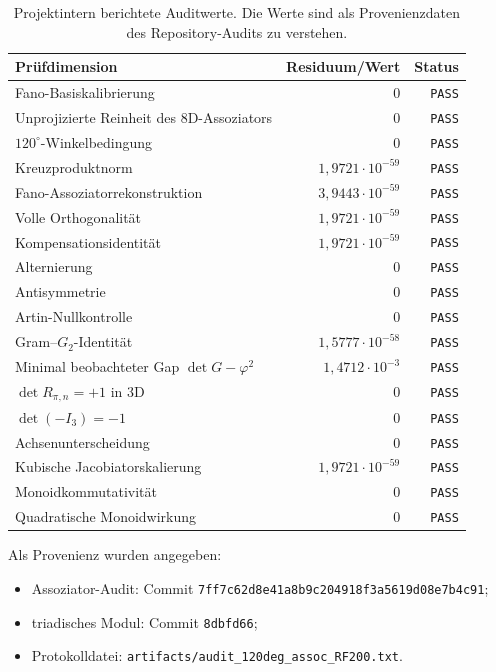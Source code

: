 \documentclass[11pt,a4paper]{article}
\theoremstyle{definition}
\begin{document}
\begin{table}[ht]
\centering
\small
\caption{Projektintern berichtete Auditwerte. Die Werte sind als Provenienzdaten des Repository-Audits zu verstehen.}
\label{tab:audit}
\begin{tabularx}{\textwidth}{@{}Xrr@{}}
\toprule
\textbf{Prüfdimension} & \textbf{Residuum/Wert} & \textbf{Status}\\
\midrule
Fano-Basiskalibrierung & $0$ & \texttt{PASS}\\
Unprojizierte Reinheit des 8D-Assoziators & $0$ & \texttt{PASS}\\
$120^\circ$-Winkelbedingung & $0$ & \texttt{PASS}\\
Kreuzproduktnorm & $1{,}9721\cdot10^{-59}$ & \texttt{PASS}\\
Fano-Assoziatorrekonstruktion & $3{,}9443\cdot10^{-59}$ & \texttt{PASS}\\
Volle Orthogonalität & $1{,}9721\cdot10^{-59}$ & \texttt{PASS}\\
Kompensationsidentität & $1{,}9721\cdot10^{-59}$ & \texttt{PASS}\\
Alternierung & $0$ & \texttt{PASS}\\
Antisymmetrie & $0$ & \texttt{PASS}\\
Artin-Nullkontrolle & $0$ & \texttt{PASS}\\
Gram--$G_2$-Identität & $1{,}5777\cdot10^{-58}$ & \texttt{PASS}\\
Minimal beobachteter Gap $\det G-\varphi^2$ & $1{,}4712\cdot10^{-3}$ & \texttt{PASS}\\
$\det R_{\pi,n}=+1$ in $3$D & $0$ & \texttt{PASS}\\
$\det(-I_3)=-1$ & $0$ & \texttt{PASS}\\
Achsenunterscheidung & $0$ & \texttt{PASS}\\
Kubische Jacobiatorskalierung & $1{,}9721\cdot10^{-59}$ & \texttt{PASS}\\
Monoidkommutativität & $0$ & \texttt{PASS}\\
Quadratische Monoidwirkung & $0$ & \texttt{PASS}\\
\bottomrule
\end{tabularx}
\end{table}

Als Provenienz wurden angegeben:
\begin{itemize}
  \item Assoziator-Audit: Commit \texttt{7ff7c62d8e41a8b9c204918f3a5619d08e7b4c91};
  \item triadisches Modul: Commit \texttt{8dbfd66};
  \item Protokolldatei: \texttt{artifacts/audit\_120deg\_assoc\_RF200.txt}.
\end{itemize}
\end{document}
